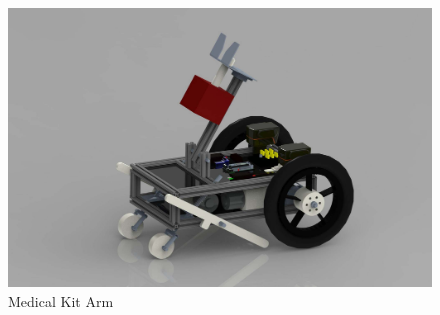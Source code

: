 \documentclass[12pt]{article}
\begin{document}
\begin{figure}[H]
    \centering
    \includegraphics[width=1.2\linewidth]{PreliminaryDesignReport/56306747_2205376912890263_6073389682769526784_n.png}
    \caption{Medical Kit Arm}
    \label{fig:my_label}
\end{figure}
\end{document}

